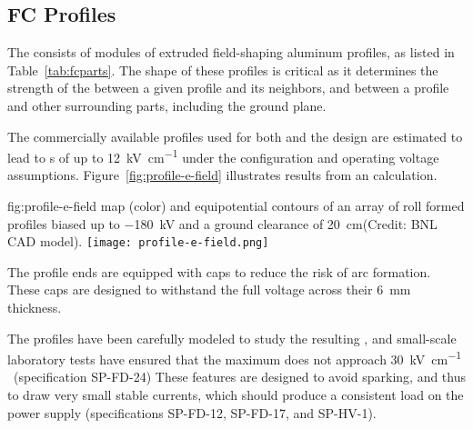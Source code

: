 \subsection{FC Profiles}
\label{sec:fdsp-hv-des-fc-profiles}

The  consists of modules of extruded field-shaping aluminum %
profiles, as listed in Table~\ref{tab:fcparts}. The shape of these %
profiles is critical as it determines the strength of the \efield{} between a given profile and its neighbors, and between a profile and 
other surrounding parts, including the ground plane.

The commercially available profiles used for both  and the  design are estimated to lead to \efield{}s of up to \SI{12}{\kilo\volt\per\centi\meter} under the 
configuration and operating voltage assumptions.
Figure~\ref{fig:profile-e-field} illustrates results from an \efield{} calculation.

\begin{dunefigure}
{fig:profile-e-field}
{\efield map (color) and equipotential contours of an array of roll formed profiles biased up to \SI{-180}{\kV} and a ground clearance of \SI{20}{\cm}(Credit: BNL CAD model).} \texttt{[image: profile-e-field.png]}
\end{dunefigure}

The profile ends are equipped with  caps to reduce the risk of arc formation.  These caps are designed %
to withstand the full voltage across their \SI{6}{\milli\m} thickness. 

The profiles have been carefully modeled to study the resulting \efield{}, 
and small-scale laboratory tests have %
ensured that the maximum \efield{} does not approach \SI{30}{\kV\per\cm}
~\cite{Blatter:2014wua}(specification SP-FD-24)
These features are designed to avoid sparking, and thus to draw very small stable currents, 
which should produce a consistent load on the power supply (specifications SP-FD-12, SP-FD-17, and SP-HV-1).

